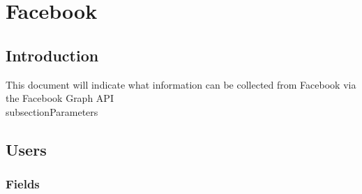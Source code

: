 \documentclass{article}
\begin{document}
\cleardoublepage
\section{Facebook}

\subsection{Introduction}
This document will indicate what information can be collected from Facebook via the Facebook Graph API
\\subsection{Parameters}
	\subsection{Users}
	\subsubsection{Fields}
\end{document}
